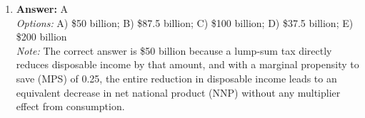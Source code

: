 \documentclass[12pt]{article}
\begin{document}
\begin{enumerate}[label=\arabic*.]
\\ \textit{Note:} Households demand more money as an asset when the nominal interest rate falls because lower interest rates reduce the opportunity cost of holding money, making it more attractive compared to other interest-earning assets.
\item \textbf{Answer:} A
\\ \textit{Options:} A) \$50 billion; B) \$87.5 billion; C) \$100 billion; D) \$37.5 billion; E) \$200 billion
\\ \textit{Note:} The correct answer is \$50 billion because a lump-sum tax directly reduces disposable income by that amount, and with a marginal propensity to save (MPS) of 0.25, the entire reduction in disposable income leads to an equivalent decrease in net national product (NNP) without any multiplier effect from consumption.
\end{enumerate}
\end{document}
